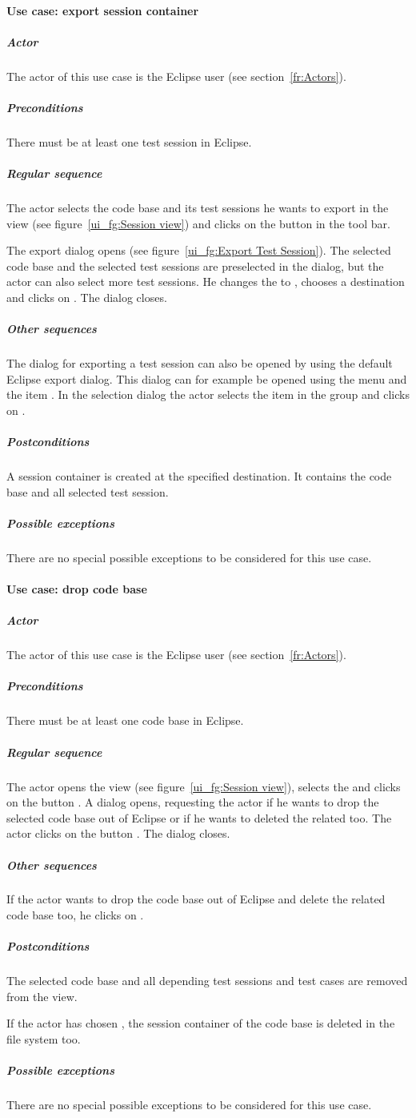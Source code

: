 \paragraph{Use case: export session container}
\subparagraph{Actor}
The actor of this use case is the Eclipse user (see section~\ref{fr:Actors}).
\subparagraph{Preconditions}
There must be at least one test session in Eclipse.
\subparagraph{Regular sequence}
The actor selects the code base and its test sessions he wants to export in the  view (see figure~\ref{ui_fg:Session view}) and clicks on the button  in the tool bar.
\par
The export dialog opens (see figure~\ref{ui_fg:Export Test Session}). The selected code base and the selected test sessions are preselected in the dialog, but the actor can also select more test sessions. He changes the  to , chooses a destination and clicks on . The dialog closes.
\subparagraph{Other sequences}
The dialog for exporting a test session can also be opened by using the default Eclipse export dialog. This dialog can for example be opened using the menu  and the item . In the selection dialog the actor selects the item  in the group  and clicks on .
\subparagraph{Postconditions}
A session container is created at the specified destination. It contains the code base and all selected test session.
\subparagraph{Possible exceptions}
There are no special possible exceptions to be considered for this use case.

\paragraph{Use case: drop code base}
\subparagraph{Actor}
The actor of this use case is the Eclipse user (see section~\ref{fr:Actors}).
\subparagraph{Preconditions}
There must be at least one code base in Eclipse.
\subparagraph{Regular sequence}
The actor opens the  view (see figure~\ref{ui_fg:Session view}), selects the  and clicks on the button . A dialog opens, requesting the actor if he wants to drop the selected code base out of Eclipse or if he wants to deleted the related  too. The actor clicks on the button . The dialog closes.
\subparagraph{Other sequences}
If the actor wants to drop the code base out of Eclipse and delete the related code base too, he clicks on .
\subparagraph{Postconditions}
The selected code base and all depending test sessions and test cases are removed from the  view.
\par
If the actor has chosen , the session container of the code base is deleted in the file system too.
\subparagraph{Possible exceptions}
There are no special possible exceptions to be considered for this use case.

